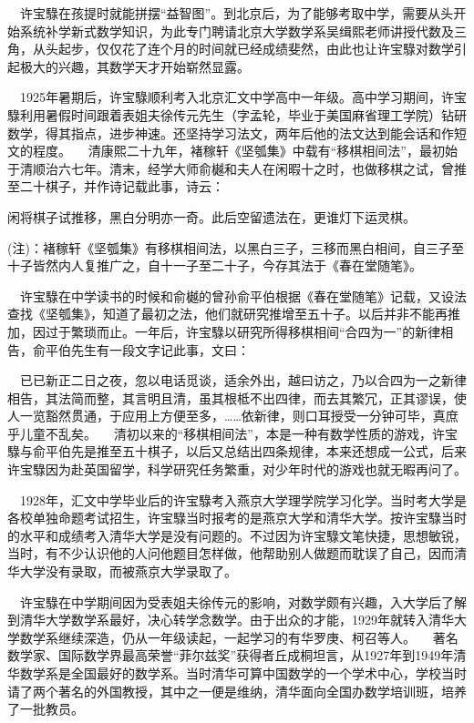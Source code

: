 \documentclass[a4paper,AutoFakeBold,oneside,12pt]{article}
\begin{document}
$\quad$许宝騄在孩提时就能拼摆“益智图”。到北京后，为了能够考取中学，需要从头开始系统补学新式数学知识，为此专门聘请北京大学数学系吴缉熙老师讲授代数及三角，从头起步，仅仅花了连个月的时间就已经成绩斐然，由此也让许宝騄对数学引起极大的兴趣，其数学天才开始崭然显露。

$\quad$1925年暑期后，许宝騄顺利考入北京汇文中学高中一年级。高中学习期间，许宝騄利用暑假时间跟着表姐夫徐传元先生（字孟轮，毕业于美国麻省理工学院）钻研数学，得其指点，进步神速。还坚持学习法文，两年后他的法文达到能会话和作短文的程度。
	$\quad$清康熙二十九年，褚稼轩《坚瓠集》中载有“移棋相间法”，最初始于清顺治六七年。清末，经学大师俞樾和夫人在闲暇十之时，也做移棋之试，曾推至二十棋子，并作诗记载此事，诗云：

闲将棋子试推移，黑白分明亦一奇。此后空留遗法在，更谁灯下运灵棋。

(注)：褚稼轩《坚瓠集》有移棋相间法，以黑白三子，三移而黑白相间，自三子至十子皆然内人复推广之，自十一子至二十子，今存其法于《春在堂随笔》。

$\quad$许宝騄在中学读书的时候和俞樾的曾孙俞平伯根据《春在堂随笔》记载，又设法查找《坚瓠集》，知道了最初之法，他们就研究推增至五十子。以后并非不能再推加，因过于繁琐而止。一年后，许宝騄以研究所得移棋相间“合四为一”的新律相告，俞平伯先生有一段文字记此事，文曰：

$\quad$已已新正二日之夜，忽以电话觅谈，适余外出，越曰访之，乃以合四为一之新律相告，其法简而整，其言明且清，虽其根柢不出四律，而去其繁冗，正其谬误，使人一览豁然贯通，于应用上方便至多，……依新律，则口耳授受一分钟可毕，真庶乎儿童不乱矣。
	$\quad$清初以来的“移棋相间法”，本是一种有数学性质的游戏，许宝騄与俞平伯先是推至五十棋子，以后又总结出四条规律，本来还想成一公式，后来许宝騄因为赴英国留学，科学研究任务繁重，对少年时代的游戏也就无暇再问了。

$\quad$1928年，汇文中学毕业后的许宝騄考入燕京大学理学院学习化学。当时考大学是各校单独命题考试招生，许宝騄当时报考的是燕京大学和清华大学。按许宝騄当时的水平和成绩考入清华大学是没有问题的。不过因为许宝騄文笔快捷，思想敏锐，当时，有不少认识他的人问他题目怎样做，他帮助别人做题而耽误了自己，因而清华大学没有录取，而被燕京大学录取了。

$\quad$许宝騄在中学期间因为受表姐夫徐传元的影响，对数学颇有兴趣，入大学后了解到清华大学数学系最好，决心转学念数学。由于出众的才能，1929年就转入清华大学数学系继续深造，仍从一年级读起，一起学习的有华罗庚、柯召等人。
	$\quad$著名数学家、国际数学界最高荣誉“菲尔兹奖”获得者丘成桐坦言，从1927年到1949年清华数学系是全国最好的数学系。当时清华可算中国数学的一个学术中心，学校当时请了两个著名的外国教授，其中之一便是维纳，清华面向全国办数学培训班，培养了一批教员。
\end{document}
